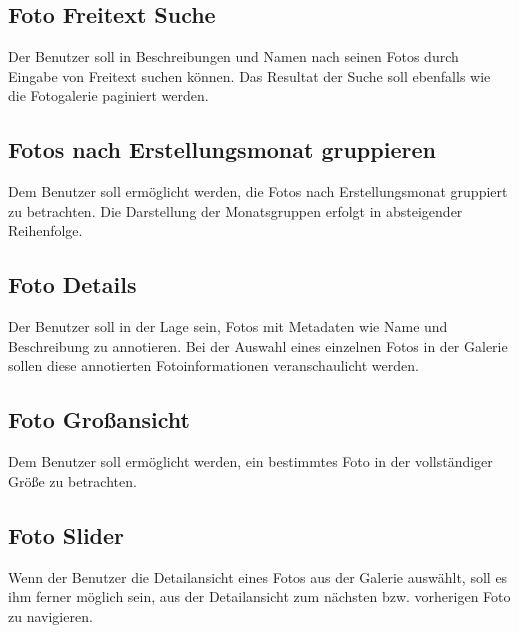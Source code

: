 \subsection{Foto Freitext Suche}
\label{sec:spec:photo_search}

Der Benutzer soll in Beschreibungen und Namen nach seinen Fotos durch Eingabe von Freitext suchen können. Das Resultat der Suche soll ebenfalls wie die Fotogalerie paginiert werden.

\subsection{Fotos nach Erstellungsmonat gruppieren}
\label{sec:spec:photo_groups}

Dem Benutzer soll ermöglicht werden, die Fotos nach Erstellungsmonat gruppiert zu betrachten. Die Darstellung der Monatsgruppen erfolgt in absteigender Reihenfolge.

\subsection{Foto Details}
\label{sec:spec:photo_details}

Der Benutzer soll in der Lage sein, Fotos mit Metadaten wie Name und Beschreibung zu annotieren. Bei der Auswahl eines einzelnen Fotos in der Galerie sollen diese annotierten Fotoinformationen veranschaulicht werden.

\subsection{Foto Großansicht}

Dem Benutzer soll ermöglicht werden, ein bestimmtes Foto in der vollständiger Größe zu betrachten.

\subsection{Foto Slider}
\label{sec:spec:photo_slider}

Wenn der Benutzer die Detailansicht eines Fotos aus der Galerie auswählt, soll es ihm ferner möglich sein, aus der Detailansicht zum nächsten bzw. vorherigen Foto zu navigieren.
